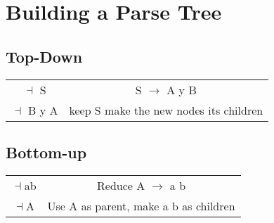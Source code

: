 \documentclass[12pt]{article}
\begin{document}
	\section*{Building a Parse Tree}
	\subsection*{Top-Down}
	\begin{tabular}{c | c }
		$\dashv$ S & S $\rightarrow$ A y B \\
		$\dashv$ B y A & keep S make the new nodes its children\\
	\end{tabular}
	
	\subsection*{Bottom-up}
	\begin{tabular}{c | c }
		$\dashv$ab & Reduce A $\rightarrow$ a b\\
		$\dashv$A & Use A as parent, make a b as children\\
	\end{tabular}
	
	
	
	
	
\end{document}
